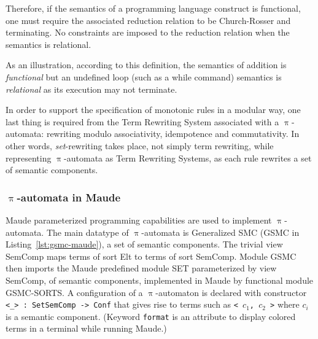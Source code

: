 \documentclass{llncs}%
\begin{document}
Therefore, if the semantics of a programming language construct is
functional, one must require the associated reduction relation to be
Church-Rosser and terminating. No constraints are imposed to the
reduction relation when the semantics is relational.

As an illustration, according to this definition, the semantics of
addition is \emph{functional} but an undefined loop (such as a while
command) semantics is \emph{relational} as its execution may not
terminate.
%

In order to support the specification of monotonic rules in a modular
way, one last thing is required from the Term Rewriting System
associated with a $\uppi$-automata: rewriting modulo
associativity, idempotence and commutativity. In other words, \emph{set}-rewriting takes place, not simply term rewriting, while
representing $\uppi$-automata as Term Rewriting
Systems, as each rule rewrites a set of semantic components.


\subsubsection{$\uppi$-automata in Maude}\label{sec:gia-in-maude}

Maude parameterized programming capabilities are used to implement 
$\uppi$-automata. The main datatype of $\uppi$-automata is Generalized SMC (GSMC in Listing~\ref{lst:gsmc-maude}), a set of semantic components. 
The trivial view SemComp maps terms of sort Elt to terms of sort SemComp.   
Module GSMC then imports the Maude predefined module SET parameterized by
view SemComp, of semantic components,
implemented in Maude by functional module GSMC-SORTS. 
A configuration of a $\uppi$-automaton is declared with 
constructor \texttt{<\_> : Set{SemComp} -> Conf} that gives rise to terms such as 
\texttt{< $c_1$, $c_2$ >} where \texttt{$c_i$} is a semantic component.
(Keyword \texttt{format} is an attribute to display colored terms in a terminal while running Maude.) 
\end{document}
